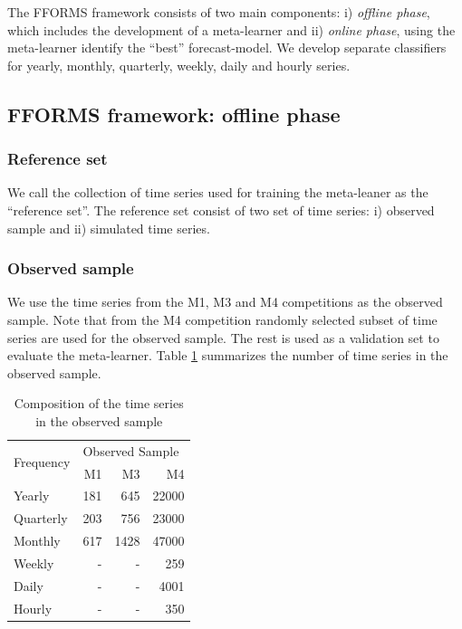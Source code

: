 \documentclass[11pt,a4paper,]{article}
\begin{document}
The FFORMS framework consists of two main components: i) \emph{offline
phase}, which includes the development of a meta-learner and ii)
\emph{online phase}, using the meta-learner identify the ``best''
forecast-model. We develop separate classifiers for yearly, monthly,
quarterly, weekly, daily and hourly series.

\subsection{FFORMS framework: offline
phase}\label{fforms-framework-offline-phase}

\subsubsection{Reference set}\label{reference-set}

We call the collection of time series used for training the meta-leaner
as the ``reference set''. The reference set consist of two set of time
series: i) observed sample and ii) simulated time series.

\subsubsection{Observed sample}\label{observed-sample}

We use the time series from the M1, M3 and M4 competitions as the
observed sample. Note that from the M4 competition randomly selected
subset of time series are used for the observed sample. The rest is used
as a validation set to evaluate the meta-learner. Table
\ref{observedsample} summarizes the number of time series in the
observed sample.

\begin{table}[!h]
\centering
\caption{Composition of the time series in the observed sample}
\label{observedsample}
\begin{tabular}{l|rrr}
\multirow{2}{*}{Frequency} & \multicolumn{3}{l}{Observed Sample} \\
                  &   M1    &    M3   &    M4  \\ \hline
  Yearly          &   181    &   645    &   22000  \\
  Quarterly       &   203    &    756   &   23000\\
  Monthly         &   617    &    1428   &  47000\\
  Weekly          &   -    &   -    &   259\\
  Daily           &   -    &   -    &   4001\\
  Hourly          &   -    &    -   &  350\\ \hline
\end{tabular}
\end{table}
\end{document}
